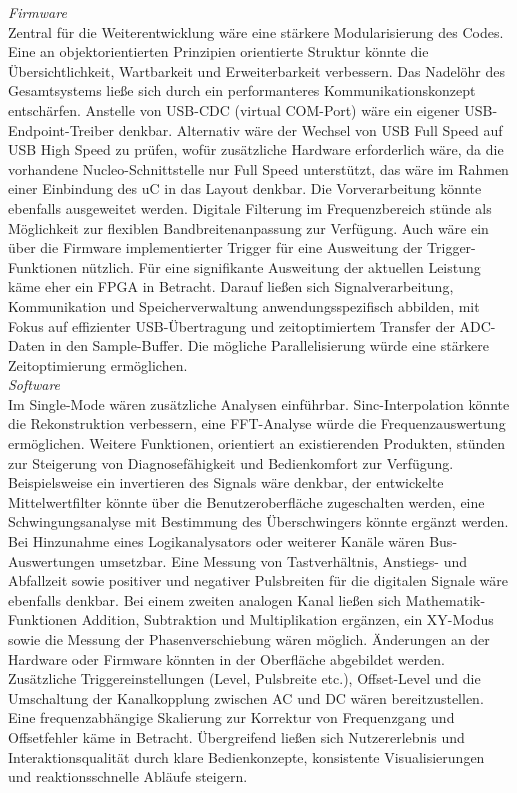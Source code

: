 \documentclass[a4paper, portrait, 12pt]{scrartcl} %
\begin{document}
\emph{Firmware}\\
Zentral für die Weiterentwicklung wäre eine stärkere Modularisierung des Codes. Eine an objektorientierten Prinzipien orientierte Struktur könnte die Übersichtlichkeit, Wartbarkeit und Erweiterbarkeit verbessern. Das Nadelöhr des Gesamtsystems ließe sich durch ein performanteres Kommunikationskonzept entschärfen. Anstelle von USB-CDC (virtual COM-Port) wäre ein eigener USB-Endpoint-Treiber denkbar. Alternativ wäre der Wechsel von USB Full Speed auf USB High Speed zu prüfen, wofür zusätzliche Hardware erforderlich wäre, da die vorhandene Nucleo-Schnittstelle nur Full Speed unterstützt, das wäre im Rahmen einer Einbindung des uC in das Layout denkbar. Die Vorverarbeitung könnte ebenfalls ausgeweitet werden. Digitale Filterung im Frequenzbereich stünde als Möglichkeit zur flexiblen Bandbreitenanpassung zur Verfügung. Auch wäre ein über die Firmware implementierter Trigger für eine Ausweitung der Trigger-Funktionen nützlich. Für eine signifikante Ausweitung der aktuellen Leistung käme eher ein FPGA in Betracht. Darauf ließen sich Signalverarbeitung, Kommunikation und Speicherverwaltung anwendungsspezifisch abbilden, mit Fokus auf effizienter USB-Übertragung und zeitoptimiertem Transfer der ADC-Daten in den Sample-Buffer. Die mögliche Parallelisierung würde eine stärkere Zeitoptimierung ermöglichen.\\

\emph{Software}\\
Im Single-Mode wären zusätzliche Analysen einführbar. Sinc-Interpolation könnte die Rekonstruktion verbessern, eine FFT-Analyse würde die Frequenzauswertung ermöglichen. Weitere Funktionen, orientiert an existierenden Produkten, stünden zur Steigerung von Diagnosefähigkeit und Bedienkomfort zur Verfügung. Beispielsweise ein invertieren des Signals wäre denkbar, der entwickelte Mittelwertfilter könnte über die Benutzeroberfläche zugeschalten werden, eine Schwingungsanalyse mit Bestimmung des Überschwingers könnte ergänzt werden. Bei Hinzunahme eines Logikanalysators oder weiterer Kanäle wären Bus-Auswertungen umsetzbar. Eine Messung von Tastverhältnis, Anstiegs- und Abfallzeit sowie positiver und negativer Pulsbreiten für die digitalen Signale wäre ebenfalls denkbar. Bei einem zweiten analogen Kanal ließen sich Mathematik-Funktionen Addition, Subtraktion und Multiplikation ergänzen, ein XY-Modus sowie die Messung der Phasenverschiebung wären möglich. Änderungen an der Hardware oder Firmware könnten in der Oberfläche abgebildet werden. Zusätzliche Triggereinstellungen (Level, Pulsbreite etc.), Offset-Level und die Umschaltung der Kanalkopplung zwischen AC und DC wären bereitzustellen. Eine frequenzabhängige Skalierung zur Korrektur von Frequenzgang und Offsetfehler käme in Betracht. Übergreifend ließen sich Nutzererlebnis und Interaktionsqualität durch klare Bedienkonzepte, konsistente Visualisierungen und reaktionsschnelle Abläufe steigern.
\end{document}
